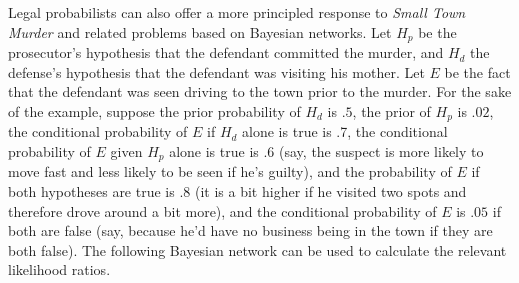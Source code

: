 \documentclass[
  10pt,
  dvipsnames,enabledeprecatedfontcommands]{scrartcl}
\begin{document}
Legal probabilists can also offer a more principled response to
\emph{Small Town Murder} and related problems based on Bayesian
networks. Let \(H_p\) be the prosecutor's hypothesis that the defendant
committed the murder, and \(H_d\) the defense's hypothesis that the
defendant was visiting his mother. Let \(E\) be the fact that the
defendant was seen driving to the town prior to the murder. For the sake
of the example, suppose the prior probability of \(H_d\) is \(.5\), the
prior of \(H_p\) is \(.02\), the conditional probability of \(E\) if
\(H_d\) alone is true is .7, the conditional probability of \(E\) given
\(H_p\) alone is true is \(.6\) (say, the suspect is more likely to move
fast and less likely to be seen if he's guilty), and the probability of
\(E\) if both hypotheses are true is \(.8\) (it is a bit higher if he
visited two spots and therefore drove around a bit more), and the
conditional probability of \(E\) is \(.05\) if both are false (say,
because he'd have no business being in the town if they are both false).
The following Bayesian network can be used to calculate the relevant
likelihood ratios.
\end{document}

